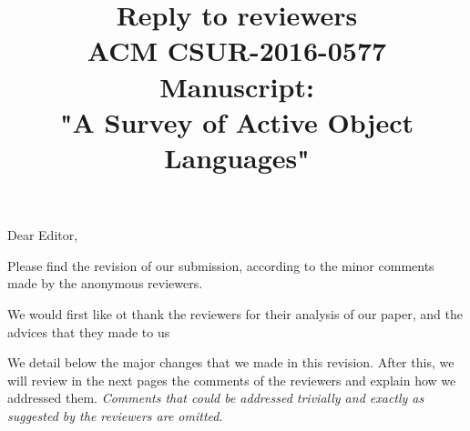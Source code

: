 \documentclass{article}
\title{Reply to reviewers\\
ACM CSUR-2016-0577 Manuscript: \\"A Survey of Active Object Languages" }
\begin{document}
\maketitle
\noindent
Dear Editor,

Please find the revision of our submission, according to the minor comments made by the 
anonymous reviewers.

We would first like ot thank the reviewers for their analysis of our paper, and the 
advices that they made to us

We detail below the major changes that we made in this revision. After this, we will 
review in the next pages the comments of the reviewers and explain how we addressed them. 
\emph{Comments that could be addressed trivially and exactly as suggested by the 
reviewers are omitted}.
\bigskip
\end{document}

